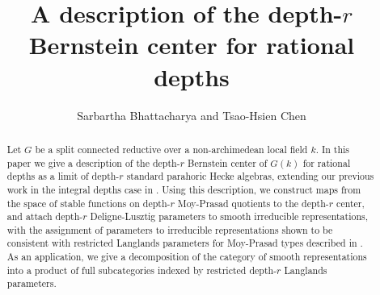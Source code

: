 \documentclass[11 pt]{article}
\title{A description of the depth-$r$ Bernstein center for rational depths}
\author{Sarbartha Bhattacharya and Tsao-Hsien Chen}
\date{}
\numberwithin{equation}{subsection}
\theoremstyle{definition}
\theoremstyle{remark}
\theoremstyle{conjecture}
\begin{document}
\maketitle
\begin{abstract}
Let $G$ be a split connected reductive  over a non-archimedean local field $k$.
In this paper we give a description of the depth-$r$ Bernstein center of $G(k)$ for rational depths 
as a limit of depth-$r$ standard parahoric Hecke algebras, extending our previous work in the integral depths case in \cite{cb24}. Using this description, we construct maps from the space of stable functions on depth-$r$ Moy-Prasad quotients to the depth-$r$ center, and attach depth-$r$ Deligne-Lusztig parameters to smooth irreducible representations, with the assignment of parameters to irreducible representations shown to be consistent with restricted Langlands parameters for Moy-Prasad types described in \cite{chendebackertsai}. 
As an application, we  give a decomposition of the category of smooth representations into a product of full subcategories
indexed by restricted depth-$r$ Langlands parameters.

   
     
\end{abstract}
\tableofcontents
\end{document}

